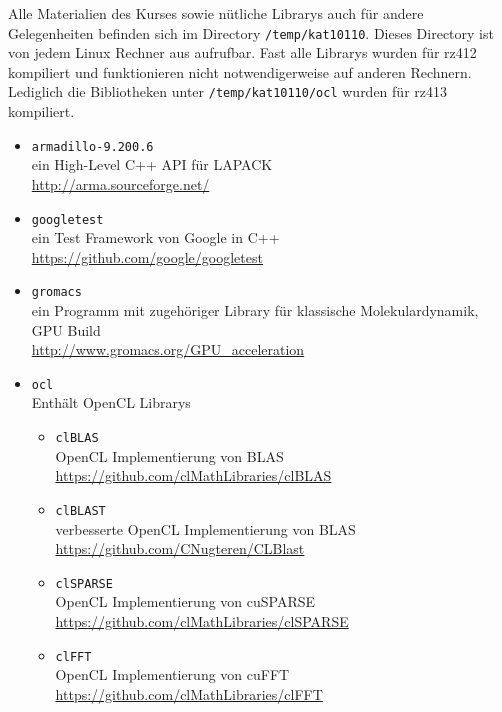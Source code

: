 \documentclass[headsepline=3pt,headinclude=true,12pt,oneside]{scrartcl}
\let\li=\lstinline
\begin{document}
	Alle Materialien des Kurses sowie nütliche Librarys auch für andere Gelegenheiten befinden sich im Directory \li`/temp/kat10110`. Dieses Directory ist von jedem Linux Rechner aus aufrufbar.
	Fast alle Librarys wurden für rz412 kompiliert und funktionieren nicht notwendigerweise auf anderen Rechnern. Lediglich die Bibliotheken unter \li`/temp/kat10110/ocl` wurden für rz413 kompiliert.
	\begin{itemize}
		\item \li`armadillo-9.200.6` \\ 
		ein High-Level C++ API für LAPACK \\
		\url{http://arma.sourceforge.net/}
		
		\item \li`googletest` \\
		ein Test Framework von Google in C++ \\
		\url{https://github.com/google/googletest}
		
		\item \li`gromacs` \\ 
		ein Programm mit zugehöriger Library für klassische Molekulardynamik, GPU Build \\
		\url{http://www.gromacs.org/GPU_acceleration}
		
		\item \li`ocl` \\
		Enthält OpenCL Librarys
		\begin{itemize}
			\item \li`clBLAS` \\  
			OpenCL Implementierung von BLAS \\
			\url{https://github.com/clMathLibraries/clBLAS}
			
			\item \li`clBLAST` \\ 
			verbesserte OpenCL Implementierung von BLAS \\
			\url{https://github.com/CNugteren/CLBlast}
			
			\item \li`clSPARSE` \\ 
			OpenCL Implementierung von cuSPARSE \\
			\url{https://github.com/clMathLibraries/clSPARSE}
			
			\item \li`clFFT` \\   
			OpenCL Implementierung von cuFFT \\
			\url{https://github.com/clMathLibraries/clFFT}
			

\end{itemize}
\end{itemize}
\end{document}
